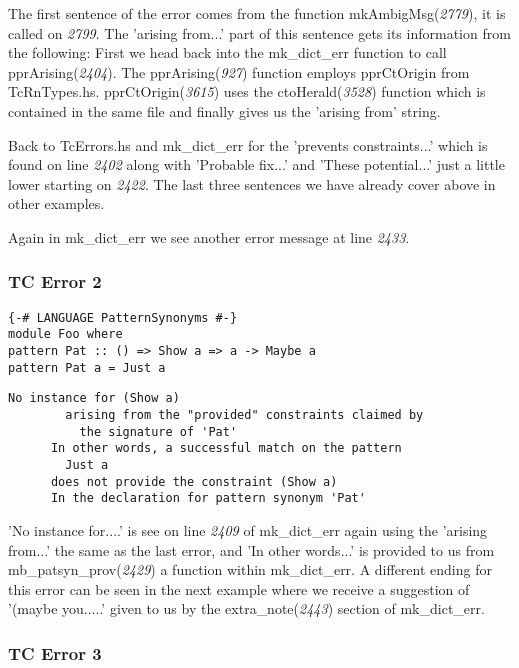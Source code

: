 \documentclass[a4paper]{article}
\begin{document}
The first sentence of the error comes from the function mkAmbigMsg(\textit{2779}), it is called on \textit{2799}. The 'arising from...' part of this sentence gets its information from the following: First we head back into the mk\_dict\_err function to call pprArising(\textit{2404}). The pprArising(\textit{927}) function employs pprCtOrigin from TcRnTypes.hs. pprCtOrigin(\textit{3615}) uses the ctoHerald(\textit{3528}) function which is contained in the same file and finally gives us the 'arising from' string.

Back to TcErrors.hs and mk\_dict\_err for the 'prevents constraints...' which is found on line \textit{2402} along with 'Probable fix...' and 'These potential...' just a little lower starting on \textit{2422}. The last three sentences we have already cover above in other examples.


Again in mk\_dict\_err we see another error message at line \textit{2433}.

\subsubsection{TC Error 2}

\begin{lstlisting}[label={lst: T16.0}, numbers=none, caption={Example Program \cite{ex16}}]
{-# LANGUAGE PatternSynonyms #-}
module Foo where
pattern Pat :: () => Show a => a -> Maybe a
pattern Pat a = Just a
\end{lstlisting}


\begin{lstlisting}[label={lst: T16.0.2}, numbers=none, caption={Error}]
No instance for (Show a)
        arising from the "provided" constraints claimed by
          the signature of 'Pat'
      In other words, a successful match on the pattern
        Just a
      does not provide the constraint (Show a)
      In the declaration for pattern synonym 'Pat'
\end{lstlisting}

'No instance for....' is see on line \textit{2409} of mk\_dict\_err again using the 'arising from...' the same as the last error, and 'In other words...' is provided to us from mb\_patsyn\_prov(\textit{2429}) a function within mk\_dict\_err. A different ending for this error can be seen in the next example where we receive a suggestion of '(maybe you.....' given to us by the extra\_note(\textit{2443}) section of mk\_dict\_err.


\subsubsection{TC Error 3}
\end{document}
